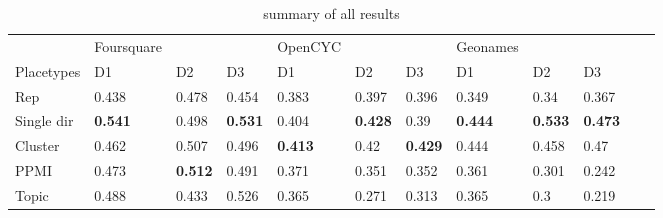\begin{landscape}
\begin{table}[]
\begin{tabular}{llll@{\hskip 0.25in}lll@{\hskip 0.25in}lllll}
			& Foursquare                      &                                 &                                 & OpenCYC                         &                                 &                                 & Geonames                        &                                 &                                 &             &             \\
			Placetypes        & D1                              & D2                              & D3                              & D1                              & D2                              & D3                              & D1                              & D2                              & D3                              &             &             \\
			\toprule[\heavyrulewidth]
			Rep               & 0.438                           & 0.478                           & 0.454                           & 0.383                           & 0.397                           & 0.396                           & 0.349                           & 0.34                            & 0.367                           &             &             \\
			Single dir        & \textbf{0.541} & 0.498                           & \textbf{0.531} & 0.404                           & \textbf{0.428} & 0.39                            & \textbf{0.444} & \textbf{0.533} & \textbf{0.473} &             &             \\
			Cluster           & 0.462                           & 0.507                           & 0.496                           & \textbf{0.413} & 0.42                            & \textbf{0.429} & 0.444                           & 0.458                           & 0.47                            &             &             \\
			PPMI              & 0.473                           & \textbf{0.512} & 0.491                           & 0.371                           & 0.351                           & 0.352                           & 0.361                           & 0.301                           & 0.242                           &             &             \\
			Topic             & 0.488                           & 0.433                           & 0.526                           & 0.365                           & 0.271                           & 0.313                           & 0.365                           & 0.3                             & 0.219                           &             &             \\   
		\end{tabular}
		\caption{summary of all results}
	\end{table}\label{bg:repsresults}
\end{landscape}

